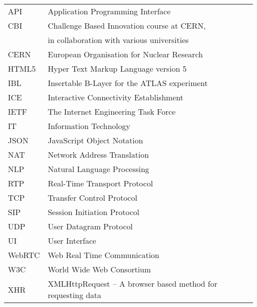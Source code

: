 \documentclass[english,12pt,a4paper,pdftex]{article}
\begin{document}





\tableofcontents


\begin{tabular}{ll}
API         & Application Programming Interface \\
CBI         & Challenge Based Innovation course at CERN,\\
            & in collaboration with various universities \\
CERN        & European Organisation for Nuclear Research \\
HTML5       & Hyper Text Markup Language version 5 \\
IBL         & Insertable B-Layer for the ATLAS experiment \\
ICE         & Interactive Connectivity Establishment \\
IETF        & The Internet Engineering Task Force \\
IT          & Information Technology \\
JSON        & JavaScript Object Notation \\
NAT         & Network Address Translation \\
NLP         & Natural Language Processing \\
RTP         & Real-Time Transport Protocol \\
TCP         & Transfer Control Protocol \\ %
SIP         & Session Initiation Protocol \\
UDP         & User Datagram Protocol \\
UI          & User Interface \\
WebRTC      & Web Real Time Communication \\
W3C         & World Wide Web Consortium \\
XHR         & XMLHttpRequest -- A browser based method for requesting data
\end{tabular}
\end{document}
